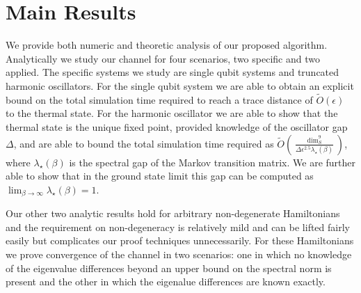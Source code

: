 \documentclass[
11pt,
 amsmath,amssymb,
 aps,
onecolumn, 
nofootinbib]{revtex4-2}
\newcommand{\bigotilde}[1]{\widetilde{O} \left( #1 \right)}
\begin{document}
\section{Main Results}
We provide both numeric and theoretic analysis of our proposed algorithm. Analytically we study our channel for four scenarios, two specific and two applied. The specific systems we study are single qubit systems and truncated harmonic oscillators. For the single qubit system we are able to obtain an explicit bound on the total simulation time required to reach a trace distance of $\bigotilde{\epsilon}$ to the thermal state. For the harmonic oscillator we are able to show that the thermal state is the unique fixed point, provided knowledge of the oscillator gap $\Delta$, and are able to bound the total simulation time required as $\bigotilde{\frac{\dim_S^9}{\Delta \epsilon^{2.5} \lambda_\star(\beta) }}$, where $\lambda_\star(\beta)$ is the spectral gap of the Markov transition matrix. We are further able to show that in the ground state limit this gap can be computed as $\lim_{\beta \to \infty} \lambda_\star(\beta) = 1$. 

Our other two analytic results hold for arbitrary non-degenerate Hamiltonians and the requirement on non-degeneracy is relatively mild and can be lifted fairly easily but complicates our proof techniques unnecessarily. For these Hamiltonians we prove convergence of the channel in two scenarios: one in which no knowledge of the eigenvalue differences beyond an upper bound on the spectral norm is present and the other in which the eigenalue differences are known exactly. 

\end{document}
